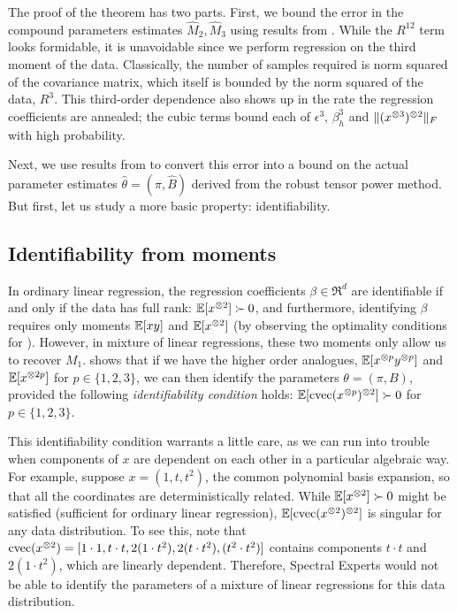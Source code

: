 The proof of the theorem has two parts.
First, we bound the error in the compound parameters estimates $\hat M_2,\hat M_3$
using results from \citet{Tomioka2011}.
While the $R^{12}$ term looks formidable, it is unavoidable since we
perform regression on the third moment of the data. Classically, the
number of samples required is norm squared of the covariance matrix,
which itself is bounded by the norm squared of the data, $R^3$. This
third-order dependence also shows up in the rate the regression
coefficients are annealed; the cubic terms bound each of $\epsilon^3$,
$\beta_h^3$ and $\|(x^{\otimes 3})^{\otimes 2}\|_F$ with high probability. 

Next, we use results from \citet{AnandkumarGeHsu2012} to convert this error
into a bound on the actual parameter estimates $\hat\theta = (\hat\pi, \hat B)$
derived from the robust tensor power method.
But first, let us study a more basic property: identifiability.


\subsection{Identifiability from moments}

In ordinary linear regression, the regression coefficients $\beta \in
\Re^d$ are identifiable if and only if the data has full rank:
$\operatorname{\mathbb{E}}[x^{\otimes 2}] \succ 0$, and furthermore, identifying $\beta$ requires
only moments $\operatorname{\mathbb{E}}[xy]$ and $\operatorname{\mathbb{E}}[x^{\otimes 2}]$ (by observing the optimality
conditions for ).  However, in mixture of linear regressions,
these two moments only allow us to recover $M_1$.  
shows that if we have the higher order analogues, $\operatorname{\mathbb{E}}[x^{\otimes p}y^{\otimes p}]$
and $\operatorname{\mathbb{E}}[x^{\otimes 2p}]$ for $p \in \{1,2,3\}$, we can then identify the
parameters $\theta = (\pi, B)$,
provided the following \emph{identifiability condition} holds: $\operatorname{\mathbb{E}}[\operatorname{cvec}(x^{\otimes p})^{\otimes 2}] \succ
0$ for $p \in \{1,2,3\}$.

This identifiability condition warrants a little care,
as we can run into trouble when components of $x$ are dependent on each other
in a particular algebraic way.
For example, suppose $x = (1, t, t^2)$, the common polynomial
basis expansion, so that all the coordinates are deterministically
related.  While $\operatorname{\mathbb{E}}[x^{\otimes 2}] \succ 0$ might be satisfied (sufficient for ordinary linear regression),
$\operatorname{\mathbb{E}}[\operatorname{cvec}(x^{\otimes 2})^{\otimes 2}]$ is singular for
any data distribution.
To see this, note that $\operatorname{cvec}(x^{\otimes 2}) = [1 \cdot 1, t\cdot t, 2(1
\cdot t^2), 2(t \cdot t^2), (t^2 \cdot t^2)]$ contains components $t
\cdot t$ and $2(1 \cdot t^2)$, which are linearly dependent.  Therefore,
Spectral Experts would not be able to identify the parameters of
a mixture of linear regressions for this data distribution.

